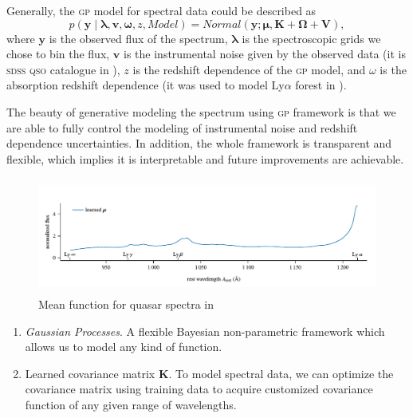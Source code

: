 \documentclass{ar-1col}
\begin{document}
Generally, the \textsc{gp} model for spectral data could be described as
\begin{equation}
    p( \mathbf{y} \mid \mathbf{\lambda}, \mathbf{v}, \mathbf{\omega}, z, Model ) 
    = Normal( \mathbf{y}; \mathbf{\mu}, \mathbf{K} + \mathbf{\Omega} + \mathbf{V} ), 
\end{equation}
where $\mathbf{y}$ is the observed flux of the spectrum, 
$\mathbf{\lambda}$ is the spectroscopic grids we chose to bin the flux, 
$\mathbf{v}$ is the instrumental noise given by the observed data (it is \textsc{sdss} \textsc{qso} catalogue \citep{SDSS09} in \citet{Garnett17}), $z$ is the redshift dependence of the \textsc{gp} model, and $\omega$ is the absorption redshift dependence (it was used to model
 Ly$\alpha$ forest in \citet{Garnett17}). 
 
The beauty of generative modeling the spectrum using \textsc{gp} framework is that we are able to fully control the modeling of instrumental noise and redshift dependence uncertainties. 
In addition, the whole framework is transparent and flexible, which implies it is interpretable and future improvements are achievable. 


\begin{figure}
    \includegraphics[width=5in, height=1.5in]{images/mean_function.pdf}
    \caption{Mean function for quasar spectra in \citet{Garnett17}}
    \label{fig:mean_function}
\end{figure}


\begin{summary}
    \begin{enumerate}
    \item \textit{Gaussian Processes}. A flexible Bayesian non-parametric framework which allows us to model any kind of function.
    \item Learned covariance matrix $\mathbf{K}$. To model spectral data, we can optimize the covariance matrix using training data to acquire customized covariance function of any given range of wavelengths.
    \end{enumerate}
\end{summary}
    
\end{document}
